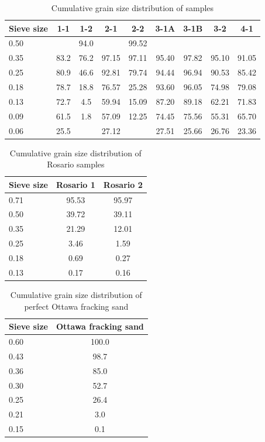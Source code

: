 \begin{table}[H]
\centering
\label{tab:Cgzd}
\begin{tabular}{lcccccccc}
\toprule
Sieve size & 1-1 & 1-2 & 2-1 & 2-2 & 3-1A & 3-1B & 3-2 & 4-1\\
\midrule
0.50    &      & 94.0 &       & 99.52 &       &       &       &       \\
0.35    & 83.2 & 76.2 & 97.15 & 97.11 & 95.40 & 97.82 & 95.10 & 91.05 \\
0.25    & 80.9 & 46.6 & 92.81 & 79.74 & 94.44 & 96.94 & 90.53 & 85.42 \\
0.18    & 78.7 & 18.8 & 76.57 & 25.28 & 93.60 & 96.05 & 74.98 & 79.08 \\
0.13    & 72.7 & 4.5  & 59.94 & 15.09 & 87.20 & 89.18 & 62.21 & 71.83 \\
0.09    & 61.5 & 1.8  & 57.09 & 12.25 & 74.45 & 75.56 & 55.31 & 65.70 \\
0.06    & 25.5 &      & 27.12 &       & 27.51 & 25.66 & 26.76 & 23.36 \\
\bottomrule
\end{tabular}
\caption{Cumulative grain size distribution of samples}
\end{table}

\begin{table}[H]
\centering
\label{tab:Cgzd}
\begin{tabular}{lcc}
\toprule
Sieve size & Rosario 1 & Rosario 2 \\
\midrule
0.71 & 95.53 & 95.97 \\
0.50 & 39.72 & 39.11 \\ 
0.35 & 21.29 & 12.01 \\
0.25 & 3.46  & 1.59  \\ 
0.18 & 0.69  & 0.27  \\ 
0.13 & 0.17  & 0.16  \\
\bottomrule
\end{tabular}
\caption{Cumulative grain size distribution of Rosario samples}
\end{table}

\begin{table}[H]
\centering
\label{tab:Cgzd}
\begin{tabular}{lc}
\toprule
Sieve size & Ottawa fracking sand \\
\midrule
0.60 & 100.0\\
0.43 & 98.7 \\ 
0.36 & 85.0 \\
0.30 & 52.7 \\ 
0.25 & 26.4 \\ 
0.21 & 3.0  \\
0.15 & 0.1  \\
\bottomrule
\end{tabular}
\caption{Cumulative grain size distribution of perfect Ottawa fracking sand \autocite{bensonFracSandUnited2015}}
\end{table}


